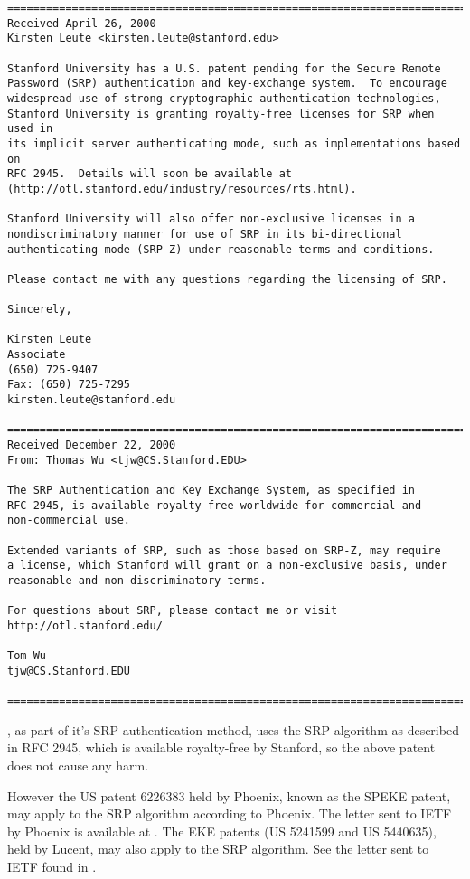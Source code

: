 \begin{verbatim}
=============================================================================
Received April 26, 2000
Kirsten Leute <kirsten.leute@stanford.edu>

Stanford University has a U.S. patent pending for the Secure Remote
Password (SRP) authentication and key-exchange system.  To encourage
widespread use of strong cryptographic authentication technologies,
Stanford University is granting royalty-free licenses for SRP when used in
its implicit server authenticating mode, such as implementations based on
RFC 2945.  Details will soon be available at
(http://otl.stanford.edu/industry/resources/rts.html).

Stanford University will also offer non-exclusive licenses in a
nondiscriminatory manner for use of SRP in its bi-directional
authenticating mode (SRP-Z) under reasonable terms and conditions.

Please contact me with any questions regarding the licensing of SRP.

Sincerely,

Kirsten Leute
Associate
(650) 725-9407
Fax: (650) 725-7295
kirsten.leute@stanford.edu

=============================================================================
Received December 22, 2000
From: Thomas Wu <tjw@CS.Stanford.EDU>

The SRP Authentication and Key Exchange System, as specified in
RFC 2945, is available royalty-free worldwide for commercial and
non-commercial use.

Extended variants of SRP, such as those based on SRP-Z, may require
a license, which Stanford will grant on a non-exclusive basis, under
reasonable and non-discriminatory terms.

For questions about SRP, please contact me or visit
http://otl.stanford.edu/

Tom Wu
tjw@CS.Stanford.EDU

=============================================================================
\end{verbatim}

\par
\gnutls{}, as part of it's SRP authentication method,
uses the SRP algorithm as described in RFC 2945, which
is available royalty-free by Stanford, so the above patent does
not cause any harm. 

However the US patent 6226383 held by Phoenix, known as the SPEKE patent,
may apply to the SRP algorithm according to Phoenix.
The letter sent to IETF by Phoenix is available at .
The EKE patents (US 5241599 and US 5440635), held by Lucent,
may also apply to the SRP algorithm. See the letter sent to IETF found in
.
